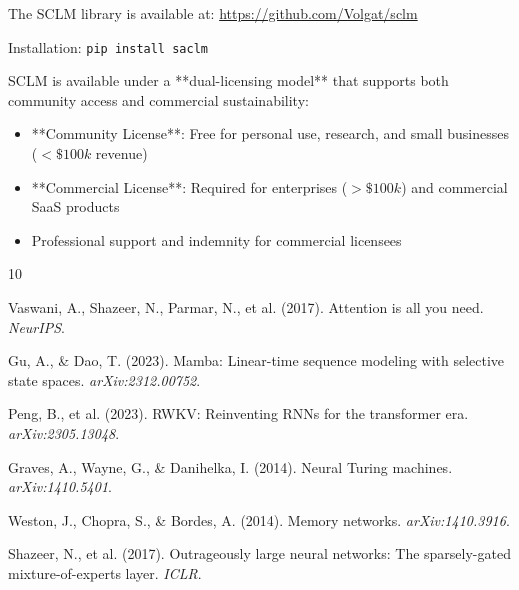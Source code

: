 \documentclass[11pt,a4paper]{article}
\begin{document}
The SCLM library is available at: \url{https://github.com/Volgat/sclm}

Installation: \texttt{pip install saclm}


SCLM is available under a **dual-licensing model** that supports both community access and commercial sustainability:
\begin{itemize}
    \item **Community License**: Free for personal use, research, and small businesses ($<\$100k$ revenue)
    \item **Commercial License**: Required for enterprises ($>\$100k$) and commercial SaaS products
    \item Professional support and indemnity for commercial licensees
\end{itemize}


\begin{thebibliography}{10}

Vaswani, A., Shazeer, N., Parmar, N., et al. (2017).
\newblock Attention is all you need.
\newblock \textit{NeurIPS}.

Gu, A., \& Dao, T. (2023).
\newblock Mamba: Linear-time sequence modeling with selective state spaces.
\newblock \textit{arXiv:2312.00752}.

Peng, B., et al. (2023).
\newblock RWKV: Reinventing RNNs for the transformer era.
\newblock \textit{arXiv:2305.13048}.

Graves, A., Wayne, G., \& Danihelka, I. (2014).
\newblock Neural Turing machines.
\newblock \textit{arXiv:1410.5401}.

Weston, J., Chopra, S., \& Bordes, A. (2014).
\newblock Memory networks.
\newblock \textit{arXiv:1410.3916}.

Shazeer, N., et al. (2017).
\newblock Outrageously large neural networks: The sparsely-gated mixture-of-experts layer.
\newblock \textit{ICLR}.

\end{thebibliography}
\end{document}
